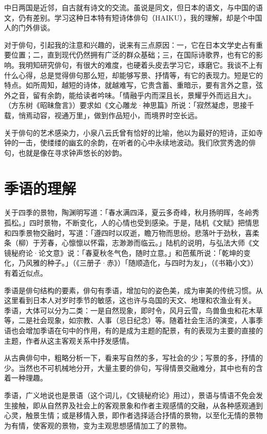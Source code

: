 {\FS
    中日两国是近邻，自古就有诗文的交流。虽说是同文，但日本的语文，与中国的语文，仍有差别。学习这种日本特有短诗体俳句（HAIKU），我的理解，却是个中国人的门外俳谈。

    对于俳句，引起我的注意和兴趣的，说来有三点原因：一，它在日本文学史占有重要位置；二，直到现代仍然拥有广泛的群众基础；三，在国际诗歌界，也有它的影响。我明知研究俳句，有很大的难度，也硬着头皮去学习它，琢磨它。我谈不上有什么心得，总是觉得俳句那么短，却能够写景、抒情等，有它的表现力。短是它的特点。如所周知，越短的诗体，就越难写，它贵含蓄、重暗示，要有言外之意，弦外之音，留有余韵，能给读者吟味。「情融乎内而深且长，景耀乎外而远且大」。（方东树《昭昧詹言》）要求如《文心雕龙·神思篇》所说：「寂然凝虑，思接千载，悄焉动容，视通万里」，做到作品短小，而境界时空长远。

    关于俳句的艺术感染力，小泉八云氏曾有恰好的比喻，他以为最好的短诗，正如寺钟的一击，使缕缕的幽玄的余韵，在听者的心中永续地波动。我们欣赏秀逸的俳句，也就是像在寻求钟声悠长的妙韵。

    \section*{\FS 季语的理解}

    关于四季的景物，陶渊明写道：「春水满四泽，夏云多奇峰，秋月扬明晖，冬岭秀孤松。」四时景物，不断变化，人的心情也受到感染。于是，陆机《文赋》把情思和四季景物交融时，写道：「遵四时以叹逝，瞻万物而思纷。悲落叶于劲秋，喜柔条（柳）于芳春，心懔懔以怀霜，志渺渺而临云。」陆机的说明，与弘法大师《文镜秘府论·论文意》说：「春夏秋冬气色，随时立意。」和芭蕉所说：「乾坤的变化，乃风雅的种子。」（《三册子·赤》）「随顺造化，与四时为友」，（《书箱小文》）有着近似点。

    季语是俳句结构的要素，俳句有季语，增加句的姿色美，成为审美的传统习惯。从这里看到日本人对岁时季节的敏感，这也许与岛国的天文、地理和农渔业有关。
    季语，大体可以分为二类：一是自然现象，即时令，风月云雪，鸟兽鱼虫和花木草等，二是社会现象，如宗教、人事（忌日纪念）等。随着社会生活的演变，人事季语也会增加季语在句中的作用，有的是成为主题的配景，有的表现为主要的直接的主题，作者从这主客观关系中抒发感情。

    从古典俳句中，粗略分析一下，看来写自然的多，写社会的少；写景的多，抒情的少。当然也不可机械地分开，大量主要的俳句，写得情景交融难分，其中也有的含着一种理趣。

    季语，广义地说也是景语（这个词儿，《文镜秘府论》用过），景语与情语不免会发生接触，即从自然界及社会上的客观景象和作者主观感情的交融，从各种感观通到心灵，触景生情；或是移情入景，即作者选择适合抒情的景物，以至化无情的景物为有情，使客观的景物，变为主观思想感情加工了的景物。

}
